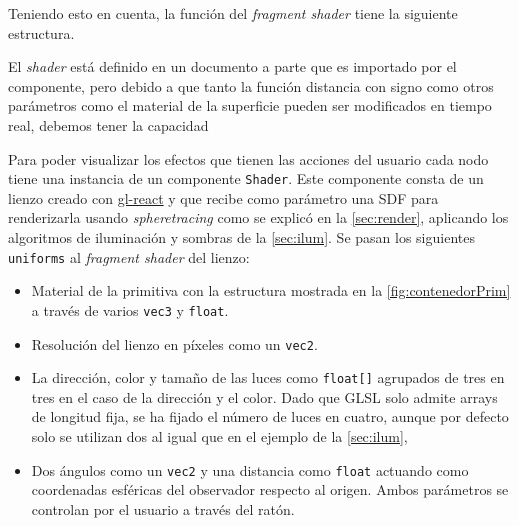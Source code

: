 Teniendo esto en cuenta, la función del \textit{fragment shader} tiene la siguiente estructura.


El \textit{shader} está definido en un documento a parte que es importado por el componente, pero debido a que tanto la función distancia con signo como otros parámetros como el material de la superficie pueden ser modificados en tiempo real, debemos tener la capacidad


Para poder visualizar los efectos que tienen las acciones del usuario cada nodo tiene una instancia de un componente \texttt{Shader}. Este componente consta de un lienzo creado con \href{https://github.com/gre/gl-react}{gl-react} y que recibe como parámetro una SDF para renderizarla usando \textit{spheretracing} como se explicó en la \autoref{sec:render}, aplicando los algoritmos de iluminación y sombras de la \autoref{sec:ilum}. Se pasan los siguientes \texttt{uniforms} al \textit{fragment shader} del lienzo: 
\begin{itemize}
    \item Material de la primitiva con la estructura mostrada en la \autoref{fig:contenedorPrim} a través de varios \texttt{vec3} y \texttt{float}. 
    \item Resolución del lienzo en píxeles como un \texttt{vec2}.
    \item La dirección, color y tamaño de las luces como \texttt{float[]} agrupados de tres en tres en el caso de la dirección y el color. Dado que GLSL solo admite arrays de longitud fija, se ha fijado el número de luces en cuatro, aunque por defecto solo se utilizan dos al igual que en el ejemplo de la \autoref{sec:ilum},
    \item Dos ángulos como un \texttt{vec2} y una distancia como \texttt{float} actuando como coordenadas esféricas del observador respecto al origen. Ambos parámetros se controlan por el usuario a través del ratón.
\end{itemize}